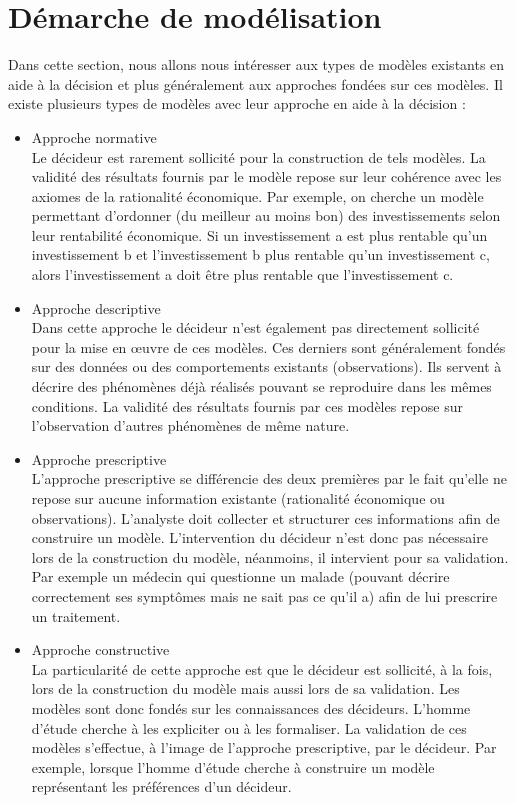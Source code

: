 \section{Démarche de modélisation}
Dans cette section, nous allons nous intéresser aux types de modèles existants en aide à la décision et plus généralement aux approches fondées sur ces modèles. Il existe plusieurs types de modèles avec leur approche en aide à la décision :
\begin{itemize}
\item Approche normative\\
 Le décideur est rarement sollicité pour la construction de tels modèles. La validité des résultats fournis par le modèle repose sur leur cohérence avec les axiomes de la rationalité économique. Par exemple, on cherche un modèle permettant d’ordonner (du meilleur au moins bon) des investissements selon leur rentabilité économique. Si un investissement a est plus rentable qu’un investissement b et l’investissement b plus rentable qu’un investissement c, alors l’investissement a doit être plus rentable que l’investissement c.
\item Approche descriptive \\
Dans cette approche le décideur n’est également pas directement sollicité pour la mise en œuvre de ces modèles. Ces derniers sont généralement fondés sur des données ou des comportements existants (observations). Ils servent à décrire des phénomènes déjà réalisés pouvant se reproduire dans les mêmes conditions. La validité des résultats fournis par ces modèles repose sur l’observation d’autres phénomènes de même nature.
\item Approche prescriptive \\
L’approche prescriptive se différencie des deux premières par le fait qu’elle ne repose sur aucune information existante (rationalité économique ou observations). L’analyste doit collecter et structurer ces informations afin de construire un modèle. L’intervention du décideur n’est donc pas nécessaire lors de la construction du modèle, néanmoins, il intervient pour sa validation. Par exemple un médecin qui questionne un malade (pouvant décrire correctement ses symptômes mais ne sait pas ce qu’il a) afin de lui prescrire un traitement.
\item Approche constructive \\
La particularité de cette approche est que le décideur est sollicité, à la fois, lors de la construction du modèle mais aussi lors de sa validation. Les modèles sont donc fondés sur les connaissances des décideurs. L’homme d’étude cherche à les expliciter ou à les formaliser. La validation de ces modèles s’effectue, à l’image de l’approche prescriptive, par le décideur. Par exemple, lorsque l’homme d’étude cherche à construire un modèle représentant les préférences d’un décideur.

\end{itemize}

